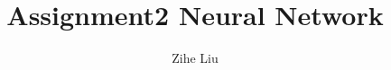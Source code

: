 \documentclass[10pt,twocolumn]{article}
\begin{document}
\title{\vspace*{-.6in}Assignment2 Neural Network\vspace*{-.1in}}
\author{
	Zihe Liu
}
\maketitle









\end{document}
